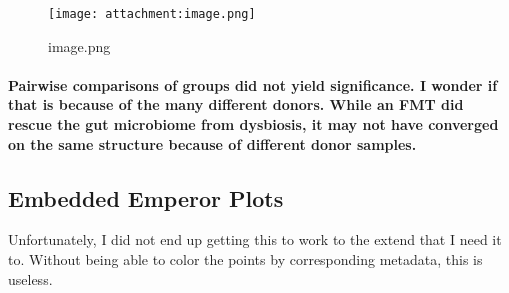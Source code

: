 \documentclass[11pt]{article}
\makeatletter
\def\maxwidth{\ifdim\Gin@nat@width>\linewidth\linewidth
    \else\Gin@nat@width\fi}
\let\Oldincludegraphics\includegraphics
\renewcommand{\includegraphics}[1]{\Oldincludegraphics[width=.8\maxwidth]{#1}}
\makeatother
\begin{document}
    \begin{figure}
\centering
\texttt{[image: attachment:image.png]}
\caption{image.png}
\end{figure}

\hypertarget{pairwise-comparisons-of-groups-did-not-yield-significance.-i-wonder-if-that-is-because-of-the-many-different-donors.-while-an-fmt-did-rescue-the-gut-microbiome-from-dysbiosis-it-may-not-have-converged-on-the-same-structure-because-of-different-donor-samples.}{%
\paragraph{Pairwise comparisons of groups did not yield significance. I
wonder if that is because of the many different donors. While an FMT did
rescue the gut microbiome from dysbiosis, it may not have converged on
the same structure because of different donor
samples.}\label{pairwise-comparisons-of-groups-did-not-yield-significance.-i-wonder-if-that-is-because-of-the-many-different-donors.-while-an-fmt-did-rescue-the-gut-microbiome-from-dysbiosis-it-may-not-have-converged-on-the-same-structure-because-of-different-donor-samples.}}

    \hypertarget{embedded-emperor-plots}{%
\subsection{Embedded Emperor Plots}\label{embedded-emperor-plots}}

Unfortunately, I did not end up getting this to work to the extend that
I need it to. Without being able to color the points by corresponding
metadata, this is useless.
\end{document}
